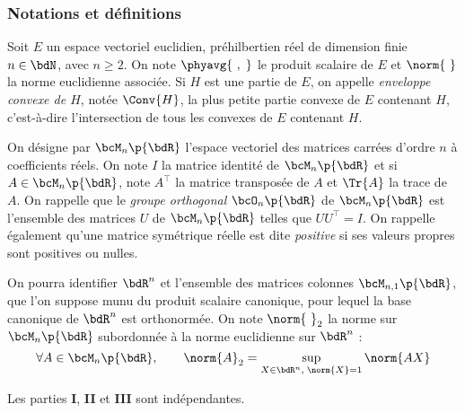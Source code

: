 \documentclass[a4paper,french,bookmarks]{article}
\begin{document}
    \renewcommand{\thesection}{\Roman{section}}
    \renewcommand{\thesubsection}{\Roman{section}.\Alph{subsection}}
    \renewcommand{\labelenumi}{\thesection.\arabic{enumi}.}
    \renewcommand*{\labelenumii}{\alph{enumii})}

    
    \subsubsection*{Notations et définitions}
    
    \begin{enumerate}
        \itt Soit $E$ un espace vectoriel euclidien, \ie préhilbertien réel de dimension finie $n \in \bdN$, avec $n \geq 2$. On note $\phyavg{\ ,\; }$ le produit scalaire de $E$ et $\norm{\ }$ la norme euclidienne associée. Si $H$ est une partie de $E$, on appelle \emph{enveloppe convexe de $H$}, notée $\Conv{H}$, la plus petite partie convexe de $E$ contenant $H$, c'est-à-dire l'intersection de tous les convexes de $E$ contenant $H$.
        
        \itt On désigne par $\bcM_n\p{\bdR}$ l'espace vectoriel des matrices carrées d'ordre $n$ à coefficients réels. On note $I$ la matrice identité de $\bcM_n\p{\bdR}$ et si $A \in \bcM_n\p{\bdR}$, note $A^\top$ la matrice transposée de $A$ et $\Tr{A}$ la trace de $A$. On rappelle que le \emph{groupe orthogonal} $\bcO_n\p{\bdR}$ de $\bcM_n\p{\bdR}$ est l'ensemble des matrices $U$ de $\bcM_n\p{\bdR}$ telles que $UU^\top = I$. On rappelle également qu'une matrice symétrique réelle est dite \emph{positive} si ses valeurs propres sont positives ou nulles.
        
        \itt On pourra identifier $\bdR^n$ et l'ensemble des matrices colonnes $\bcM_{n, 1}\p{\bdR}$, que l'on suppose munu du produit scalaire canonique, pour lequel la base canonique de $\bdR^n$ est orthonormée. On note $\norm{\ }_2$ la norme sur $\bcM_n\p{\bdR}$ subordonnée à la norme euclidienne sur $\bdR^n$ : 
        \[ \forall A \in \bcM_n\p{\bdR},\qquad \norm{A}_2 = \sup\limits_{X \in \bdR^n,\; \norm{X} = 1}\norm{AX}\]
    \end{enumerate}
    
    Les parties \textbf{\sffamily I}, \textbf{\sffamily II} et \textbf{\sffamily III} sont indépendantes.
    
\end{document}
